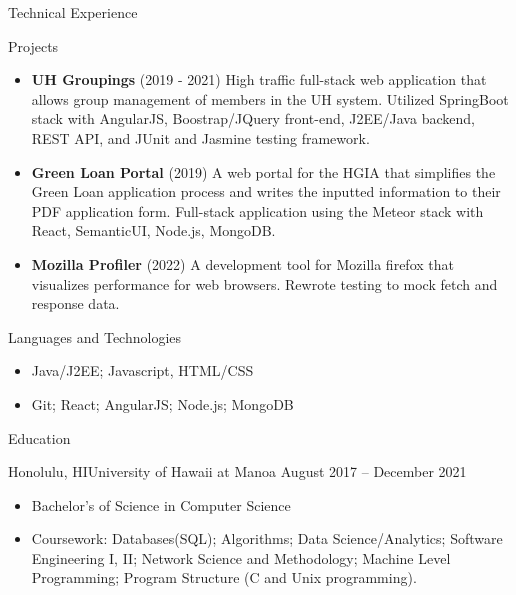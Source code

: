 \documentclass[]{mcdowellcv}
\begin{document}
	\begin{cvsection}{Technical Experience}
		\begin{cvsubsection}{Projects}{}{}
			\begin{itemize}
				\item \textbf{UH Groupings} (2019 - 2021) High traffic full-stack web application that allows group management of members in the UH system. Utilized SpringBoot stack with AngularJS, Boostrap/JQuery front-end, J2EE/Java backend, REST API, and JUnit and Jasmine testing framework.
				\item \textbf{Green Loan Portal} (2019) A web portal for the HGIA that simplifies the Green Loan application process and writes the inputted information to their PDF application form. Full-stack application using the Meteor stack with React, SemanticUI, Node.js, MongoDB.
				\item \textbf{Mozilla Profiler} (2022) A development tool for Mozilla firefox that visualizes performance for web browsers. Rewrote testing to mock fetch and response data.
			\end{itemize}
		\end{cvsubsection}
	\end{cvsection}
	
	\begin{cvsection}{Languages and Technologies}
		\begin{cvsubsection}{}{}{}	
			\begin{itemize}
				\item Java/J2EE; Javascript, HTML/CSS
				\item Git; React; AngularJS; Node.js; MongoDB
			\end{itemize}
		\end{cvsubsection}
	\end{cvsection}

	\begin{cvsection}{Education}
		\begin{cvsubsection}{Honolulu, HI}{University of Hawaii at Manoa }{August 2017 -- December 2021}
			\begin{itemize}
				\item Bachelor's of Science in Computer Science
				\item Coursework: Databases(SQL); Algorithms; Data Science/Analytics; Software Engineering I, II; Network Science and Methodology; Machine Level Programming; Program Structure (C and Unix programming).
			\end{itemize}
		\end{cvsubsection}
	\end{cvsection}
\end{document}
